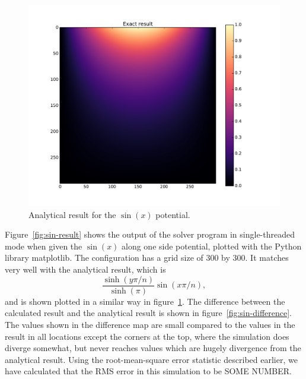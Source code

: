 	\begin{figure}[h]
	\centering
	\includegraphics[width=1.1\linewidth]{sin300_exact.pdf}
	\caption{Analytical result for the $\sin(x)$ potential.}
	\label{fig:sin-analytic}
	\end{figure}

Figure~\ref{fig:sin-result} shows the output of the solver program in single-threaded mode when given the $\sin(x)$ along one side
potential, plotted with the Python library matplotlib. The configuration has a grid size of 300 by 300. It matches very well with the analytical result, which
is
$$\frac{\sinh(y \pi / n)}{\sinh(\pi)} \sin(x \pi / n),$$
and is shown plotted in a similar way in figure~\ref{fig:sin-analytic}. The difference between the calculated result and the
analytical result is shown in figure~\ref{fig:sin-difference}. The values shown in the difference map are small compared
to the values in the result in all locations except the corners at the top, where the simulation does diverge somewhat, 
but never reaches values which are hugely divergence from the analytical result. Using the root-mean-square error statistic
described earlier, we have calculated that the RMS error in this simulation to be SOME NUMBER.


